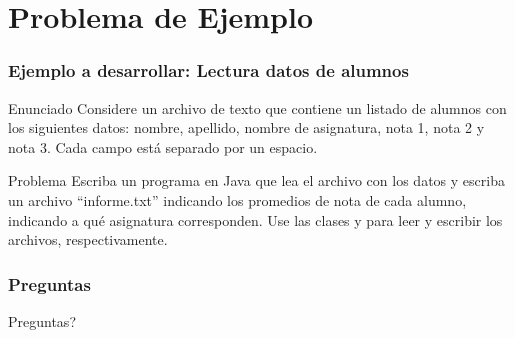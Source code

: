 \documentclass{beamer}
\begin{document}
\section{Problema de Ejemplo}

\begin{frame}
  \frametitle{Ejemplo a desarrollar: Lectura datos de alumnos}

  \begin{block}{Enunciado}
    Considere un archivo de texto que contiene un listado de alumnos
    con los siguientes datos: nombre, apellido, nombre de asignatura,
    nota 1, nota 2 y nota 3. Cada campo está separado por un espacio.
  \end{block}

  \begin{block}{Problema}
    Escriba un programa en Java que lea el archivo con los datos y
    escriba un archivo ``informe.txt'' indicando los promedios de nota
    de cada alumno, indicando a qué asignatura corresponden. Use las
    clases  y  para leer y escribir
    los archivos, respectivamente.
  \end{block}

\end{frame}

\begin{frame}
  \frametitle{Preguntas}
  \hspace{4cm}\huge{Preguntas?}
\end{frame}
\end{document}
